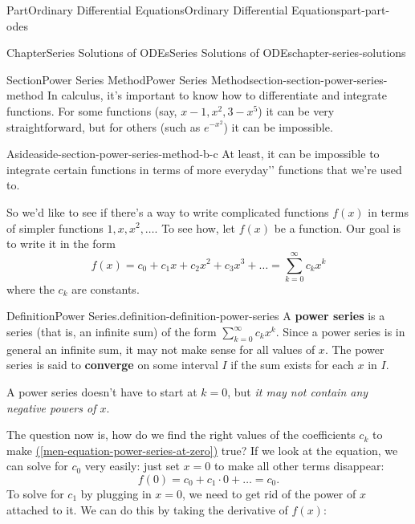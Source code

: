 \documentclass[twoside,10pt,]{book}
\newcommand{\xreffont}{\relax}
\newcommand{\terminology}[1]{\textbf{#1}}
\numberwithin{equation}{part}
\begin{document}
\begin{partptx}{Part}{Ordinary Differential Equations}{}{Ordinary Differential Equations}{}{}{part-part-odes}
\begin{chapterptx}{Chapter}{Series Solutions of ODEs}{}{Series Solutions of ODEs}{}{}{chapter-series-solutions}
%
%
\typeout{************************************************}
\typeout{************************************************}
%
\begin{sectionptx}{Section}{Power Series Method}{}{Power Series Method}{}{}{section-section-power-series-method}
In calculus, it's important to know how to differentiate and integrate functions. For some functions (say, \(x-1,x^{2},3-x^{5}\)) it can be very straightforward, but for others (such as \(e^{-x^{2}}\)) it can be impossible. \begin{aside}{Aside}{}{aside-section-power-series-method-b-c}%
At least, it can be impossible to integrate certain functions in terms of more \textasciigrave{}\textasciigrave{}everyday'{}'{} functions that we're used to.%
\end{aside}
%
\par
So we'd like to see if there's a way to write complicated functions \(f(x)\) in terms of simpler functions \(1,x,x^{2},\dots\). To see how, let \(f(x)\) be a function. Our goal is to write it in the form%
\begin{equation}
f(x) = c_{0}+c_{1}x+c_{2}x^{2}+c_{3}x^{3}+\dots = \sum_{k=0}^{\infty}c_{k}x^{k}\label{men-equation-power-series-at-zero}
\end{equation}
where the \(c_{k}\) are constants.%
\begin{definition}{Definition}{Power Series.}{definition-definition-power-series}%
A \terminology{power series} is a series (that is, an infinite sum) of the form \(\sum_{k=0}^{\infty}c_{k}x^{k}\). Since a power series is in general an infinite sum, it may not make sense for all values of \(x\). The power series is said to \terminology{converge} on some interval \(I\) if the sum exists for each \(x\) in \(I\).%
\end{definition}
A power series doesn't have to start at \(k=0\), but \emph{it may not contain any negative powers of \(x\)}.%
\par
The question now is, how do we find the right values of the coefficients \(c_{k}\) to make \hyperref[men-equation-power-series-at-zero]{({\xreffont\ref{men-equation-power-series-at-zero}})} true? If we look at the equation, we can solve for \(c_{0}\) very easily: just set \(x=0\) to make all other terms disappear:%
\begin{equation*}
f(0) = c_{0} + c_{1}\cdot0+\dots = c_{0}.
\end{equation*}
To solve for \(c_{1}\) by plugging in \(x=0\), we need to get rid of the power of \(x\) attached to it. We can do this by taking the derivative of \(f(x)\):%

\end{sectionptx}
\end{chapterptx}
\end{partptx}
\end{document}
